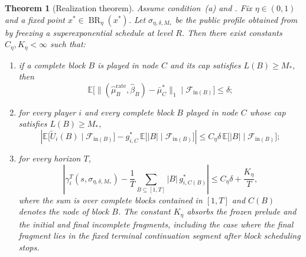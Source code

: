 \documentclass[12pt]{article}
\newtheorem{theorem}{Theorem}[section]
\theoremstyle{definition}
\newcommand{\E}{\mathbb{E}}
\newcommand{\1}{\mathbf{1}}
\newcommand{\cF}{\mathcal{F}}
\DeclareMathOperator{\BR}{BR}
\begin{document}
\begin{theorem}[Realization theorem]
\label{thm:realization}
Assume condition~\textnormal{(a)} and . Fix
$\eta\in(0,1)$ and a fixed point $x^*\in\BR_\eta(x^*)$. Let
$\sigma_{\eta,\delta,M_*}$ be the public profile obtained from
 by freezing a superexponential schedule at level $R$.
Then there exist constants $C_\eta,K_\eta<\infty$ such that:
\begin{enumerate}[label=\textnormal{(Q\arabic*)},leftmargin=2.8em]
\item if a complete block $B$ is played in node $C$ and its cap satisfies
$L(B)\ge M_*$, then
\begin{equation}
\label{eq:block-occupation-realization}
\E\bigl[\|(\widehat\mu_B^{\mathrm{rate}},\widehat\beta_B)-\bar\mu_C^*\|_1
\mid \cF_{\mathrm{in}(B)}\bigr]
\le \delta;
\end{equation}
\item for every player $i$ and every complete block $B$ played in node $C$
whose cap satisfies $L(B)\ge M_*$,
\begin{equation}
\label{eq:block-payoff-realization}
\left|
\E\bigl[\widetilde U_i(B)\mid \cF_{\mathrm{in}(B)}\bigr]
-
g_{i,C}^*\,\E\bigl[|B|\mid \cF_{\mathrm{in}(B)}\bigr]
\right|
\le C_\eta\delta\,\E\bigl[|B|\mid \cF_{\mathrm{in}(B)}\bigr];
\end{equation}
\item for every horizon $T$,
\begin{equation}
\label{eq:realization-tail-bound}
\left|
\gamma_i^T(s,\sigma_{\eta,\delta,M_*})
-
\frac1T\sum_{B\subseteq [1,T]} |B|\,g_{i,C(B)}^*
\right|
\le C_\eta\delta + \frac{K_\eta}{T},
\end{equation}
where the sum is over complete blocks contained in $[1,T]$ and $C(B)$ denotes the
node of block $B$. The constant $K_\eta$ absorbs the frozen prelude and the
initial and final incomplete fragments, including the case where the final
fragment lies in the fixed terminal continuation segment after block scheduling
stops.
\end{enumerate}
\end{theorem}
\end{document}
